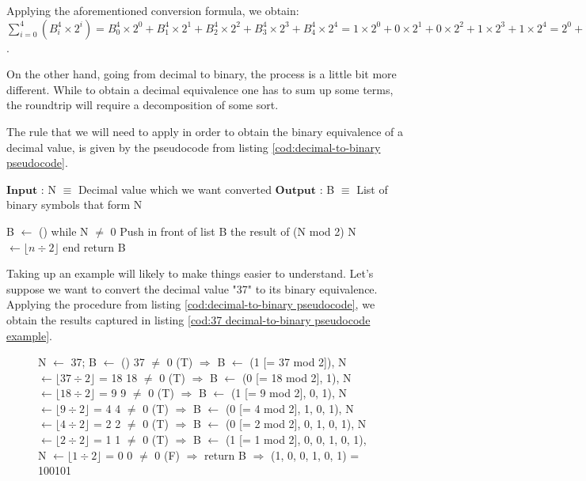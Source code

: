 \documentclass[12pt, a4paper]{book}
\begin{document}
Applying the aforementioned conversion formula, we obtain: $\sum_{i=0}^4(B^4_i \times 2^i) = B^4_0 \times 2^0 + B^4_1 \times 2^1 + B^4_2 \times 2^2 + B^4_3 \times 2^3 + B^4_4 \times 2^4 = 1 \times 2^0 + 0 \times 2^1 + 0 \times 2^2 + 1 \times 2^3 + 1 \times 2^4 = 2^0 + 2^3 + 2^4 = 1 + 8 + 16 = 25$.

On the other hand, going from decimal to binary, the process is a little bit more different. While to obtain a decimal equivalence one has to sum up some terms, the roundtrip will require a decomposition of some sort.

The rule that we will need to apply in order to obtain the binary equivalence of a decimal value, is given by the pseudocode from listing \ref{cod:decimal-to-binary pseudocode}.

\begin{pseudocode}[caption={Decimal to binary conversion algorithm}, label={cod:decimal-to-binary pseudocode}]
  $\textbf{Input}$  : N $\equiv$ Decimal value which we want converted  
  $\textbf{Output}$ : B $\equiv$ List of binary symbols that form N
  
  B $\leftarrow$ ()
  while N $\not =$ 0
    Push in front of list B the result of (N mod 2)
    N $\leftarrow \lfloor n \div 2 \rfloor$ 
  end  
  return B
\end{pseudocode}

Taking up an example will likely to make things easier to understand. Let's suppose we want to convert the decimal value "37" to its binary equivalence. Applying the procedure from listing \ref{cod:decimal-to-binary pseudocode}, we obtain the results captured in listing \ref{cod:37 decimal-to-binary pseudocode example}.

\begin{figure}[h]
  \begin{pseudocode}[caption={"37" decimal-to-binary conversion example}, label={cod:37 decimal-to-binary pseudocode example}]
  N $\leftarrow$ 37; B $\leftarrow$ ()
  37 $\not =$ 0 (T) $\Rightarrow$ B $\leftarrow$ (1 [= 37 mod 2]), N $\leftarrow \lfloor 37 \div 2 \rfloor$ = 18
  18 $\not =$ 0 (T) $\Rightarrow$ B $\leftarrow$ (0 [= 18 mod 2], 1), N $\leftarrow \lfloor 18 \div 2 \rfloor$ = 9
  9 $\not =$ 0 (T) $\Rightarrow$ B $\leftarrow$ (1 [= 9 mod 2], 0, 1), N $\leftarrow \lfloor 9 \div 2 \rfloor$ = 4
  4 $\not =$ 0 (T) $\Rightarrow$ B $\leftarrow$ (0 [= 4 mod 2], 1, 0, 1), N $\leftarrow \lfloor 4 \div 2 \rfloor$ = 2
  2 $\not =$ 0 (T) $\Rightarrow$ B $\leftarrow$ (0 [= 2 mod 2], 0, 1, 0, 1), N $\leftarrow \lfloor 2 \div 2 \rfloor$ = 1
  1 $\not =$ 0 (T) $\Rightarrow$ B $\leftarrow$ (1 [= 1 mod 2], 0, 0, 1, 0, 1), N $\leftarrow \lfloor 1 \div 2 \rfloor$ = 0
  0 $\not =$ 0 (F) $\Rightarrow$ return B $\Rightarrow$ (1, 0, 0, 1, 0, 1) = 100101
  \end{pseudocode}
\end{figure}
\end{document}
